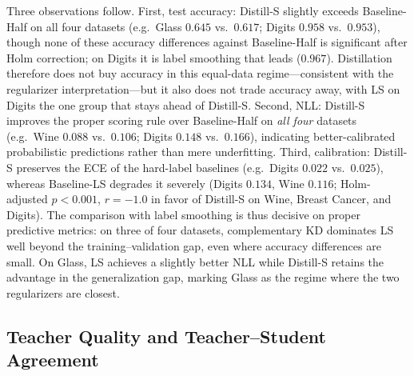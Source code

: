\documentclass[a4paper,fleqn]{cas-dc}
\begin{document}
Three observations follow. First, test accuracy: Distill-S slightly exceeds
Baseline-Half on all four datasets (e.g.\ Glass $0.645$ vs.\ $0.617$; Digits
$0.958$ vs.\ $0.953$), though none of these accuracy differences against
Baseline-Half is significant after Holm correction; on Digits it is label
smoothing that leads ($0.967$). Distillation therefore does not buy
accuracy in this equal-data regime---consistent with the regularizer
interpretation---but it also does not trade accuracy away, with LS on Digits
the one group that stays ahead of Distill-S. Second, NLL: Distill-S improves the proper
scoring rule over Baseline-Half on \emph{all four} datasets (e.g.\
Wine $0.088$ vs.\ $0.106$; Digits $0.148$ vs.\ $0.166$), indicating
better-calibrated probabilistic predictions rather than mere
underfitting. Third, calibration: Distill-S preserves the ECE of the
hard-label baselines (e.g.\ Digits $0.022$ vs.\ $0.025$), whereas
Baseline-LS degrades it severely (Digits $0.134$, Wine $0.116$;
Holm-adjusted $p<0.001$, $r=-1.0$ in favor of Distill-S on Wine,
Breast Cancer, and Digits). The comparison with label smoothing is thus
decisive on proper predictive metrics: on three of four datasets,
complementary KD dominates LS well beyond the training--validation gap,
even where accuracy differences are small. On Glass, LS achieves a
slightly better NLL while Distill-S retains the advantage in the
generalization gap, marking Glass as the regime where the two
regularizers are closest.

\subsection{Teacher Quality and Teacher--Student Agreement}
\label{sec:teacher}
\end{document}
